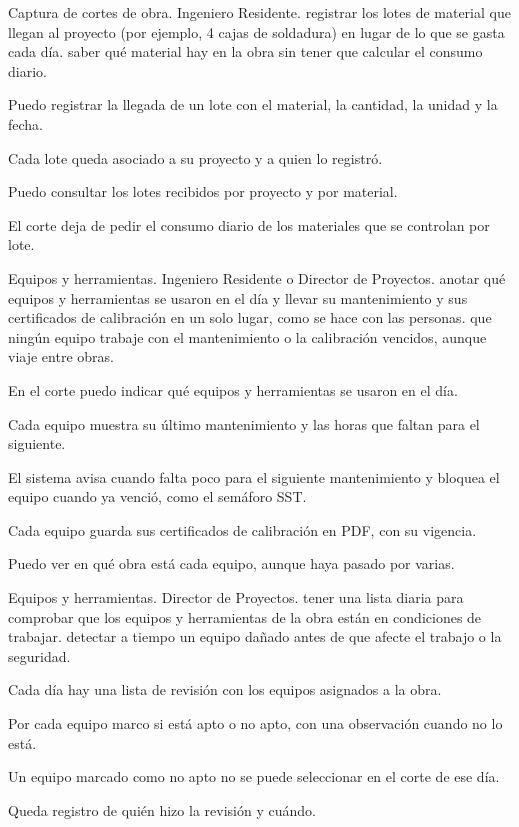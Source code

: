 \documentclass[11pt]{article}
\begin{document}
{Captura de cortes de obra.}
{Ingeniero Residente.}
{registrar los lotes de material que llegan al proyecto (por ejemplo, 4 cajas de soldadura) en lugar de lo que se gasta cada día.}
{saber qué material hay en la obra sin tener que calcular el consumo diario.}
{\item Puedo registrar la llegada de un lote con el material, la cantidad, la unidad y la fecha.
\item Cada lote queda asociado a su proyecto y a quien lo registró.
\item Puedo consultar los lotes recibidos por proyecto y por material.
\item El corte deja de pedir el consumo diario de los materiales que se controlan por lote.}

{Equipos y herramientas.}
{Ingeniero Residente o Director de Proyectos.}
{anotar qué equipos y herramientas se usaron en el día y llevar su mantenimiento y sus certificados de calibración en un solo lugar, como se hace con las personas.}
{que ningún equipo trabaje con el mantenimiento o la calibración vencidos, aunque viaje entre obras.}
{\item En el corte puedo indicar qué equipos y herramientas se usaron en el día.
\item Cada equipo muestra su último mantenimiento y las horas que faltan para el siguiente.
\item El sistema avisa cuando falta poco para el siguiente mantenimiento y bloquea el equipo cuando ya venció, como el semáforo SST.
\item Cada equipo guarda sus certificados de calibración en PDF, con su vigencia.
\item Puedo ver en qué obra está cada equipo, aunque haya pasado por varias.}

{Equipos y herramientas.}
{Director de Proyectos.}
{tener una lista diaria para comprobar que los equipos y herramientas de la obra están en condiciones de trabajar.}
{detectar a tiempo un equipo dañado antes de que afecte el trabajo o la seguridad.}
{\item Cada día hay una lista de revisión con los equipos asignados a la obra.
\item Por cada equipo marco si está apto o no apto, con una observación cuando no lo está.
\item Un equipo marcado como no apto no se puede seleccionar en el corte de ese día.
\item Queda registro de quién hizo la revisión y cuándo.}
\end{document}
